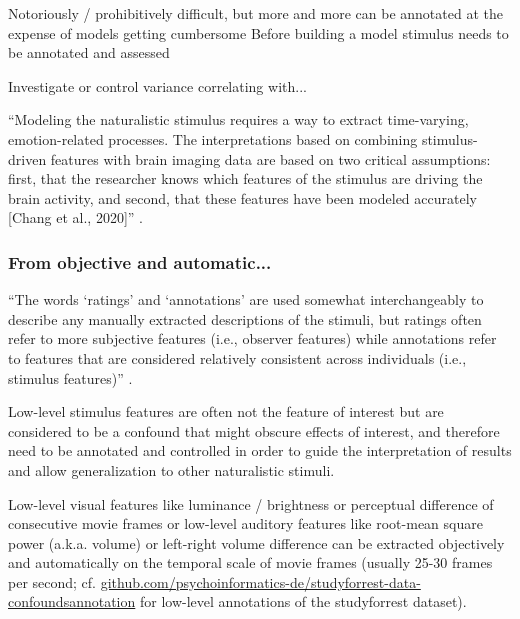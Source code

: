 Notoriously / prohibitively difficult, but more and more can be annotated at the
expense of models getting cumbersome
%
Before building a model stimulus needs to be annotated and assessed


Investigate or control variance correlating with...

%
``Modeling the naturalistic stimulus requires a way to extract time-varying,
emotion-related processes.
%
The interpretations based on combining stimulus-driven features with brain
imaging data are based on two critical assumptions:
%
first, that the researcher knows which features of the stimulus are driving the
brain activity, and second, that these features have been modeled accurately
[Chang et al., 2020]'' \citep{saarimaki2021naturalistic}.


\subsubsection{From objective and automatic...}


``The words ‘ratings’ and ‘annotations’ are used somewhat interchangeably to
describe any manually extracted descriptions of the stimuli, but ratings often
refer to more subjective features (i.e., observer features) while annotations
refer to features that are considered relatively consistent across individuals
(i.e., stimulus features)'' \citep{saarimaki2021naturalistic}.


%
Low-level stimulus features are often not the feature of interest but are
considered to be a confound that might obscure effects of interest, and
therefore need to be annotated and controlled in order to guide the
interpretation of results and allow generalization to other naturalistic
stimuli.


%
Low-level visual features like luminance / brightness or
perceptual difference of consecutive movie frames or low-level auditory features
like root-mean square power (a.k.a. volume) or left-right volume difference can
be extracted objectively and automatically on the temporal scale of movie frames
(usually 25-30 frames per second; cf.
\href{https://github.com/psychoinformatics-de/studyforrest-data-confoundsannotation
}{\url{github.com/psychoinformatics-de/studyforrest-data-confoundsannotation}}
for low-level annotations of the studyforrest dataset).

